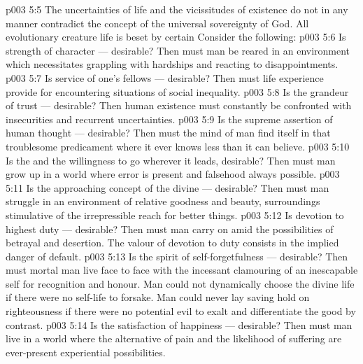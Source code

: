 \vs p003 5:5 \pc The uncertainties of life and the vicissitudes of existence do not in any manner contradict the concept of the universal sovereignty of God. All evolutionary creature life is beset by certain  Consider the following:
\vs p003 5:6 \bibnobreakspace Is  strength of character --- desirable? Then must man be reared in an environment which necessitates grappling with hardships and reacting to disappointments.
\vs p003 5:7 \bibnobreakspace Is  service of one’s fellows --- desirable? Then must life experience provide for encountering situations of social inequality.
\vs p003 5:8 \bibnobreakspace Is  the grandeur of trust --- desirable? Then human existence must constantly be confronted with insecurities and recurrent uncertainties.
\vs p003 5:9 \bibnobreakspace Is  the supreme assertion of human thought --- desirable? Then must the mind of man find itself in that troublesome predicament where it ever knows less than it can believe.
\vs p003 5:10 \bibnobreakspace Is the  and the willingness to go wherever it leads, desirable? Then must man grow up in a world where error is present and falsehood always possible.
\vs p003 5:11 \bibnobreakspace Is  the approaching concept of the divine --- desirable? Then must man struggle in an environment of relative goodness and beauty, surroundings stimulative of the irrepressible reach for better things.
\vs p003 5:12 \bibnobreakspace Is  devotion to highest duty --- desirable? Then must man carry on amid the possibilities of betrayal and desertion. The valour of devotion to duty consists in the implied danger of default.
\vs p003 5:13 \bibnobreakspace Is  the spirit of self\hyp{}forgetfulness --- desirable? Then must mortal man live face to face with the incessant clamouring of an inescapable self for recognition and honour. Man could not dynamically choose the divine life if there were no self\hyp{}life to forsake. Man could never lay saving hold on righteousness if there were no potential evil to exalt and differentiate the good by contrast.
\vs p003 5:14 \bibnobreakspace Is  the satisfaction of happiness --- desirable? Then must man live in a world where the alternative of pain and the likelihood of suffering are ever\hyp{}present experiential possibilities.
